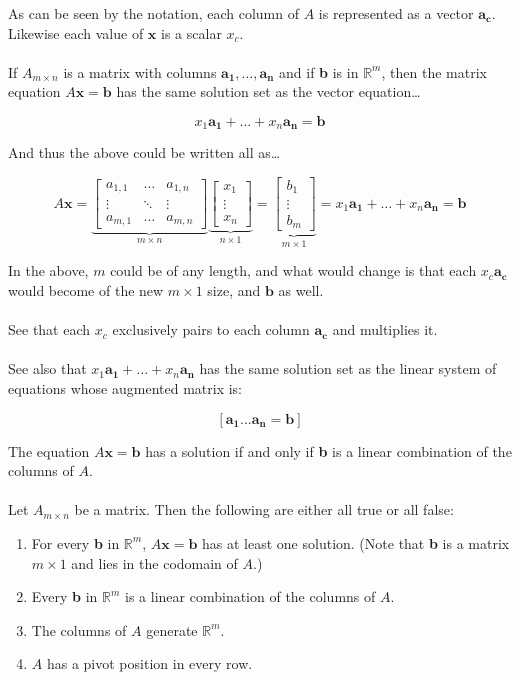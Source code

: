 \documentclass[12pt]{article}
\newcommand{\R}{\mathbb{R}}
\newcommand{\bt}[1]{\textbf{{#1}}}
\newcommand{\bm}[1]{\mathbf{{#1}}}
\newcommand{\mb}{\begin{bmatrix}}
\newcommand{\me}{\end{bmatrix}}
\begin{document}
As can be seen by the notation, each column of $A$ is represented as a vector $\bm{a_c}$. Likewise each value of $\bm{x}$ is a scalar $x_c$. \\ \\

If $A_{m\times n}$ is a matrix with columns $\bm{a_1, \dots, a_n}$  and if \bt{b} is in $\R^m$, then the matrix equation $A\bm{x} = \bm{b}$ has the same solution set as the vector equation\dots

$$x_1\bm{a_1} + \dots + x_n\bm{a_n = b}$$

And thus the above could be written all as\dots

$$A\bm{x} =
\underbrace{\mb a_{1,1} & \dots & a_{1,n} \\
\vdots & \ddots & \vdots \\
a_{m,1} & \dots & a_{m,n} \me}_{m \times n} 
\underbrace{\mb x_1 \\ \vdots \\ x_n \me}_{n \times 1} =
\underbrace{\mb b_1 \\ \vdots \\b_m \me}_{m\times 1} = x_1\bm{a_1} + \dots + x_n\bm{a_n} = \bm{b}$$

In the above, $m$ could be of any length, and what would change is that each $x_c\bm{a_c}$ would become of the new $m \times 1$ size, and $\bm{b}$ as well. \\ \\

See that each $x_c$ exclusively pairs to each column $\bm{a_c}$ and multiplies it. \\ \\

See also that $x_1\bm{a_1} + \dots + x_n\bm{a_n}$ has the same solution set as the linear system of equations whose augmented matrix is:

$$[\bm{a_1 \dots a_n = b}]$$

The equation $A\bm{x = b}$ has a solution if and only if \bt{b} is a linear combination of the columns of $A$. \\ \\

Let $A_{m \times n}$ be a matrix. Then the following are either all true or all false:

\begin{enumerate}
    \item For every \bt{b} in $\R^m$, $A\bm{x=b}$ has at least one solution. (Note that \bt{b} is a matrix $m\times 1$ and lies in the codomain of $A$.)
    \item Every \bt{b} in $\R^m$ is a linear combination of the columns of $A$.
    \item The columns of $A$ generate $\R^m$.
    \item $A$ has a pivot position in every row.
\end{enumerate}
\end{document}
